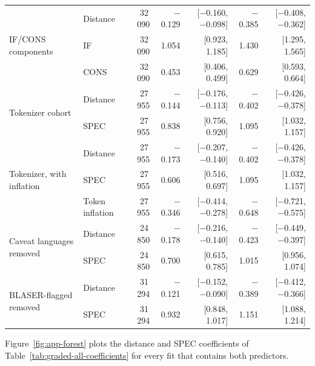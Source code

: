 \begin{table}[htbp]
\begin{tabular}{@{}llrrrrr@{}}
\midrule
\multirow{3}{*}{IF/CONS components} & Distance & 32\,090 & $-$0.129 & [$-$0.160, $-$0.098] & $-$0.385 & [$-$0.408, $-$0.362] \\
 & IF & 32\,090 & 1.054 & [0.923, 1.185] & 1.430 & [1.295, 1.565] \\
 & CONS & 32\,090 & 0.453 & [0.406, 0.499] & 0.629 & [0.593, 0.664] \\
\midrule
\multirow{2}{*}{Tokenizer cohort} & Distance & 27\,955 & $-$0.144 & [$-$0.176, $-$0.113] & $-$0.402 & [$-$0.426, $-$0.378] \\
 & SPEC & 27\,955 & 0.838 & [0.756, 0.920] & 1.095 & [1.032, 1.157] \\
\midrule
\multirow{3}{*}{Tokenizer, with inflation} & Distance & 27\,955 & $-$0.173 & [$-$0.207, $-$0.140] & $-$0.402 & [$-$0.426, $-$0.378] \\
 & SPEC & 27\,955 & 0.606 & [0.516, 0.697] & 1.095 & [1.032, 1.157] \\
 & Token inflation & 27\,955 & $-$0.346 & [$-$0.414, $-$0.278] & $-$0.648 & [$-$0.721, $-$0.575] \\
\midrule
\multirow{2}{*}{Caveat languages removed} & Distance & 24\,850 & $-$0.178 & [$-$0.216, $-$0.140] & $-$0.423 & [$-$0.449, $-$0.397] \\
 & SPEC & 24\,850 & 0.700 & [0.615, 0.785] & 1.015 & [0.956, 1.074] \\
\midrule
\multirow{2}{*}{BLASER-flagged removed} & Distance & 31\,294 & $-$0.121 & [$-$0.152, $-$0.090] & $-$0.389 & [$-$0.412, $-$0.366] \\
 & SPEC & 31\,294 & 0.932 & [0.848, 1.017] & 1.151 & [1.088, 1.214] \\
\bottomrule
\end{tabular}
\par{}
\end{table}

Figure~\ref{fig:app-forest} plots the distance and SPEC coefficients of Table~\ref{tab:graded-all-coefficients} for every fit that contains both predictors.

